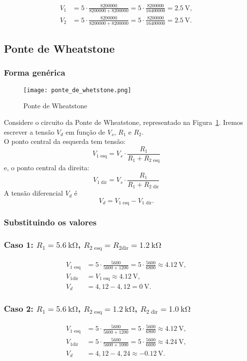 \documentclass[a4paper, 12pt]{article}
\begin{document}
\begin{align*}
V_1 &= 5 \cdot \frac{8200000}{8200000 + 8200000} 
= 5 \cdot \frac{8200000}{16400000} 
= \SI{2,5}{\volt}, \\[6pt]
V_2 &= 5 \cdot \frac{8200000}{8200000 + 8200000} 
= 5 \cdot \frac{8200000}{16400000} 
= \SI{2,5}{\volt}.
\end{align*}

\subsection{Ponte de Wheatstone}
\subsubsection{Forma genérica}

\begin{figure}[H]
\centering
\texttt{[image: ponte\_de\_whetstone.png]}
\caption{Ponte de Wheatstone}
\label{fig:ponte_de_wheatstone}
\end{figure}

Considere o circuito da Ponte de Wheatstone, representado na Figura~\ref{fig:ponte_de_wheatstone}. Iremos escrever a tensão $V_d$ em função de $V_s$, $R_1$ e $R_2$.
\\
O ponto central da esquerda tem tensão:
\[
V_{1\text{ esq}} = V_s \cdot \frac{R_1}{R_1 + R_{2\text{ esq}}}
\]
e, o ponto central da direita:
\[
V_{1\text{ dir}} = V_s \cdot \frac{R_1}{R_1 + R_{2\text{ dir}}}
\]
A tensão diferencial $V_d$ é
\[
V_d = V_{1\text{ esq}} - V_{1\text{ dir}}.
\]

\subsubsection{Substituindo os valores}
\subsubsection*{Caso 1: $R_1 = \SI{5.6}{\kilo\ohm}$, $R_{2\text{ esq}} = R_{2\text{dir}} = \SI{1.2}{\kilo\ohm}$}
\begin{align*}
V_{1\text{ esq}} &= 5 \cdot \frac{5600}{5600+1200} 
= 5 \cdot \frac{5600}{6800} 
\approx \SI{4,12}{\volt}, \\[6pt]
V_{1\text{dir}} &= V_{1\text{ esq}} \approx \SI{4,12}{\volt}, \\[6pt]
V_d &= 4,12 - 4,12 = \SI{0}{\volt}.
\end{align*}

\subsubsection*{Caso 2: $R_1 = \SI{5.6}{\kilo\ohm}$, $R_{2\text{ esq}} = \SI{1.2}{\kilo\ohm}$, $R_{2\text{ dir}} = \SI{1.0}{\kilo\ohm}$}
\begin{align*}
V_{1\text{ esq}} &= 5 \cdot \frac{5600}{5600+1200} 
= 5 \cdot \frac{5600}{6800} 
\approx \SI{4,12}{\volt}, \\[6pt]
V_{1\text{dir}} &= 5 \cdot \frac{5600}{5600+1000} 
= 5 \cdot \frac{5600}{6600} 
\approx \SI{4,24}{\volt}, \\[6pt]
V_d &= 4,12 - 4,24 \approx \SI{-0,12}{\volt}.
\end{align*}
\end{document}
